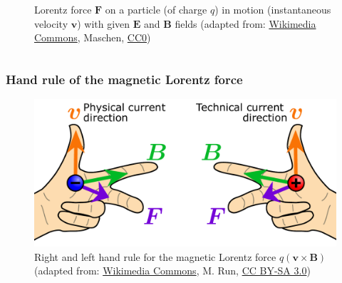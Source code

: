 \begin{frame}
\begin{columns}
\begin{column}{0.40\textwidth}
\begin{figure}
				\caption{Lorentz force $\bm{F}$ on a particle (of charge $q$) in motion (instantaneous velocity $\bm{v}$) with given $\bm{E}$ and $\bm{B}$ fields (adapted from: \href{https://commons.wikimedia.org/wiki/File:Lorentz_force_particle.svg}{Wikimedia Commons}, Maschen, \href{https://creativecommons.org/publicdomain/zero/1.0/deed.en}{CC0})}
			\end{figure}
		\end{column}
		\end{columns}
\end{frame}

\begin{frame}
	\frametitle{Hand rule of the magnetic Lorentz force}
    \begin{figure}
        \centering
        \includegraphics[height=0.6\textheight]{fig/lec02/Hand-rule-charges-both-hands.pdf}
        \caption{Right and left hand rule for the magnetic Lorentz force $q\left(\bm{v}\times\bm{B}\right)$ (adapted from: \href{https://commons.wikimedia.org/wiki/File:Right-hand-rule-charges-both-hands.svg}{Wikimedia Commons}, M. Run, \href{https://creativecommons.org/licenses/by-sa/3.0/deed.en}{CC BY-SA 3.0})}
    \end{figure}
\end{frame}

